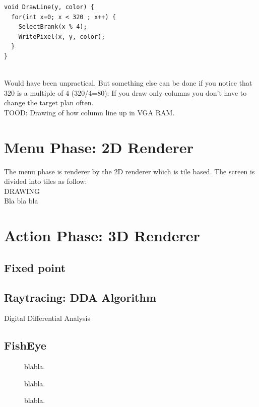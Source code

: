 \documentclass[book.tex]{subfiles}
\begin{document}
\begin{verbatim}
void DrawLine(y, color) {
  for(int x=0; x < 320 ; x++) {
    SelectBrank(x % 4);
    WritePixel(x, y, color);   
  }
}
\end{verbatim}\\
Would have been unpractical. But something else can be done if you notice that 320 is a multiple of 4 (320/4=80): If you draw only columns you don't have to change the target plan often.\\
TOOD: Drawing of how column line up in VGA RAM.\\

\section{Menu Phase: 2D Renderer}
The menu phase is renderer by the 2D renderer which is tile based. The screen is divided into tiles as follow:\\
DRAWING\\
Bla bla bla\\

\section{Action Phase: 3D Renderer}
\subsection{Fixed point}
\subsection{Raytracing: DDA Algorithm}
Digital Differential Analysis\\
\subsection{FishEye}

\begin{figure}[H]
\centering
 
 \caption{blabla.} \label{fig:Raycasting2}
\end{figure}

\begin{figure}[H]
\centering
 
 \caption{blabla.} \label{fig:Raycasting2}
\end{figure}

\begin{figure}[H]
\centering
 
 \caption{blabla.} \label{fig:Raycasting2}
\end{figure}
\end{document}
